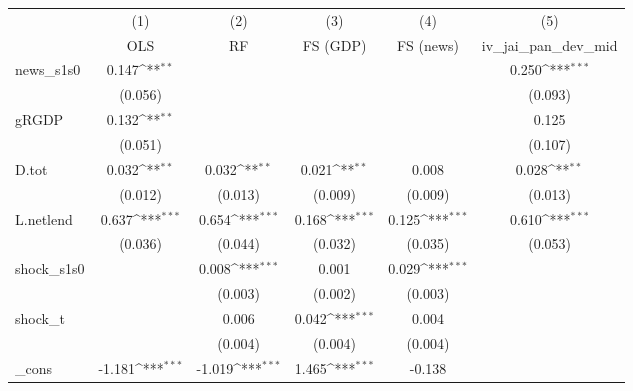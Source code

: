 {
\def\sym#1{\ifmmode^{#1}\else\(^{#1}\)\fi}
\begin{tabular}{l*{5}{c}}
\toprule
            &\multicolumn{1}{c}{(1)}&\multicolumn{1}{c}{(2)}&\multicolumn{1}{c}{(3)}&\multicolumn{1}{c}{(4)}&\multicolumn{1}{c}{(5)}\\
            &\multicolumn{1}{c}{OLS}&\multicolumn{1}{c}{RF}&\multicolumn{1}{c}{FS (GDP)}&\multicolumn{1}{c}{FS (news)}&\multicolumn{1}{c}{iv\_jai\_pan\_dev\_mid}\\
\midrule
news\_s1s0   &       0.147\sym{**} &                     &                     &                     &       0.250\sym{***}\\
            &     (0.056)         &                     &                     &                     &     (0.093)         \\
\addlinespace
gRGDP       &       0.132\sym{**} &                     &                     &                     &       0.125         \\
            &     (0.051)         &                     &                     &                     &     (0.107)         \\
\addlinespace
D.tot       &       0.032\sym{**} &       0.032\sym{**} &       0.021\sym{**} &       0.008         &       0.028\sym{**} \\
            &     (0.012)         &     (0.013)         &     (0.009)         &     (0.009)         &     (0.013)         \\
\addlinespace
L.netlend   &       0.637\sym{***}&       0.654\sym{***}&       0.168\sym{***}&       0.125\sym{***}&       0.610\sym{***}\\
            &     (0.036)         &     (0.044)         &     (0.032)         &     (0.035)         &     (0.053)         \\
\addlinespace
shock\_s1s0  &                     &       0.008\sym{***}&       0.001         &       0.029\sym{***}&                     \\
            &                     &     (0.003)         &     (0.002)         &     (0.003)         &                     \\
\addlinespace
shock\_t     &                     &       0.006         &       0.042\sym{***}&       0.004         &                     \\
            &                     &     (0.004)         &     (0.004)         &     (0.004)         &                     \\
\addlinespace
\_cons      &      -1.181\sym{***}&      -1.019\sym{***}&       1.465\sym{***}&      -0.138         &                     \\

\end{tabular}}
